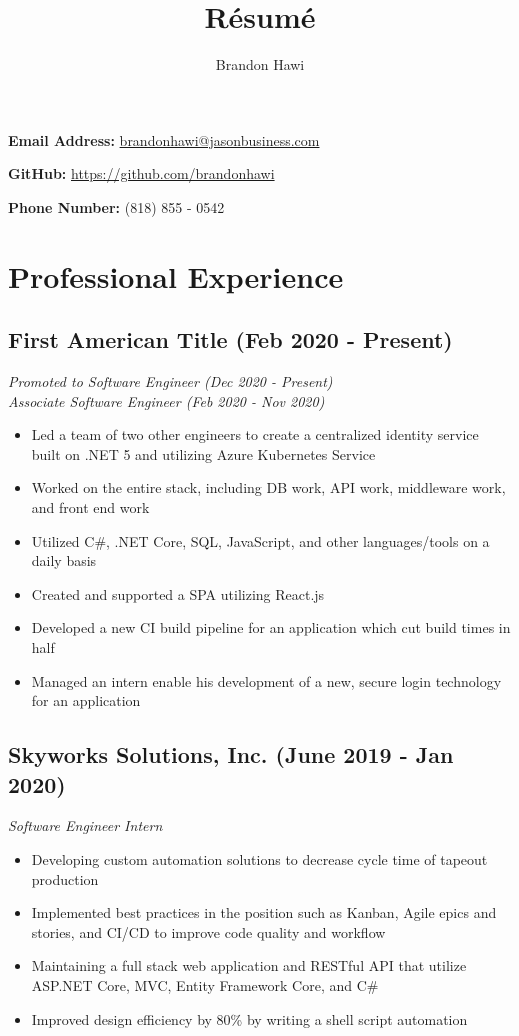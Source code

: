 \documentclass[10pt]{article}
\makeatletter
\renewcommand{\maketitle}
{
\huge
\noindent\textbf{\theauthor} \hfill \small{ \textbf{Email Address: }\href{mailto:brandonhawi@jasonbusiness.com}{brandonhawi@jasonbusiness.com}

\hfill \textbf{GitHub: }\href{https://github.com/brandonhawi}{https://github.com/brandonhawi}

\hfill \textbf{Phone Number: }(818) 855 - 0542}}
\makeatother
\begin{document}
\title{R\'esum\'e}
\author{Brandon Hawi}

\maketitle
\vspace{-0.1in}

\section{Professional Experience}

\subsection{First American Title (Feb 2020 - Present)}

\noindent\textit{Promoted to Software Engineer (Dec 2020 - Present)}\\
\noindent\textit{Associate Software Engineer (Feb 2020 - Nov 2020)}

\begin{itemize}
	\setlength\itemsep{0em}
	\item Led a team of two other engineers to create a centralized identity service built on .NET 5 and utilizing Azure Kubernetes Service
	\item Worked on the entire stack,  including DB work,  API work,  middleware work,  and front end work
	\item Utilized C\#,  .NET Core,  SQL,  JavaScript,  and other languages/tools on a daily basis
	\item Created and supported a SPA utilizing React.js
	\item Developed a new CI build pipeline for an application which cut build times in half 
	\item Managed an intern enable his development of a new,  secure login technology for an application
\end{itemize}

\subsection{Skyworks Solutions, Inc. (June 2019 - Jan 2020)}

\noindent\textit{Software Engineer Intern}

\begin{itemize}
	\setlength\itemsep{0em}
	\item Developing custom automation solutions to decrease cycle time of tapeout production
	\item Implemented best practices in the position such as Kanban, Agile epics and stories, and CI/CD to improve code quality and workflow
	\item Maintaining a full stack web application and RESTful API that utilize ASP.NET Core, MVC, Entity Framework Core, and C\#
	\item Improved design efficiency by 80\% by writing a shell script automation
\end{itemize}
\end{document}
